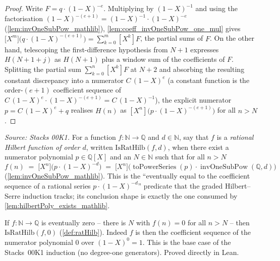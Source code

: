 \begin{proof}
  \leanok
  Write \(F = q\cdot(1-X)^{-e}\). Multiplying by
  \((1-X)^{-1}\) and using the factorisation
  \((1-X)^{-(e+1)} = (1-X)^{-1}\cdot(1-X)^{-e}\)
  (\cref{lem:invOneSubPow_mathlib}), \cref{lem:coeff_invOneSubPow_one_mul} gives
  \(\bigl[X^m\bigr]\bigl(q\cdot(1-X)^{-(e+1)}\bigr) = \sum_{k=0}^{m}[X^k]F\), the
  partial sums of \(F\). On the other hand, telescoping the first-difference
  hypothesis from \(N+1\) expresses \(H(N+1+j)\) as \(H(N+1)\) plus a window sum
  of the coefficients of \(F\). Splitting the partial sum
  \(\sum_{k=0}^{n}[X^k]F\) at \(N+2\) and absorbing the resulting constant
  discrepancy into a numerator \(C\,(1-X)^{e}\) (a constant function is the
  order-\((e+1)\) coefficient sequence of \(C\,(1-X)^{e}\cdot(1-X)^{-(e+1)} =
  C\,(1-X)^{-1}\)), the explicit numerator
  \(p = C\,(1-X)^{e} + q\) realises \(H(n)\) as
  \([X^n]\bigl(p\cdot(1-X)^{-(e+1)}\bigr)\) for all \(n > N\).
\end{proof}

\begin{definition}
  \label{def:ratHilb}
  \textit{Source: Stacks 00K1.}
  For a function \(f : \mathbb{N} \to \mathbb{Q}\) and \(d \in \mathbb{N}\), say
  that \(f\) is a \emph{rational Hilbert function of order \(d\)}, written
  \(\mathrm{IsRatHilb}(f, d)\), when there exist a numerator polynomial
  \(p \in \mathbb{Q}[X]\) and an \(N \in \mathbb{N}\) such that for all \(n > N\)
  \[
    f(n) \;=\; \bigl[X^n\bigr]\bigl(p\cdot(1-X)^{-d}\bigr)
    \;=\; \bigl[X^n\bigr]\bigl(\operatorname{toPowerSeries}(p)\cdot
      \operatorname{invOneSubPow}(\mathbb{Q}, d)\bigr)
  \]
  (\cref{lem:invOneSubPow_mathlib}). This is the ``eventually equal to the
  coefficient sequence of a rational series \(p\cdot(1-X)^{-d}\)'' predicate that
  the graded Hilbert--Serre induction tracks; its conclusion shape is exactly the
  one consumed by \cref{lem:hilbertPoly_exists_mathlib}.
\end{definition}

\begin{lemma}
  \label{lem:ratHilb_ofEventuallyZero}
  If \(f : \mathbb{N} \to \mathbb{Q}\) is eventually zero -- there is
  \(N\) with \(f(n) = 0\) for all \(n > N\) -- then \(\mathrm{IsRatHilb}(f, 0)\)
  (\cref{def:ratHilb}). Indeed \(f\) is then the coefficient sequence of the
  numerator polynomial \(0\) over \((1-X)^{0} = 1\). This is the base case of the
  Stacks~00K1 induction (no degree-one generators). Proved directly in Lean.
\end{lemma}

